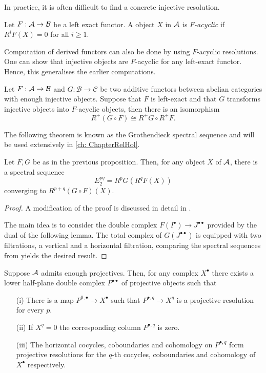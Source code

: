 In practice, it is often difficult to find a concrete injective resolution.
\begin{definition}
 Let $F:\AA \to \mathcal{B}$ be a left exact functor.
 A object $X$ in $\AA$ is {\it $F$-acyclic} if $R^iF(X) = 0$ for all $i\geq 1$.
\end{definition}
Computation of derived functors can also be done by using $F$-acyclic resolutions.
One can show that injective objects are $F$-acyclic for any left-exact functor.
Hence, this generalises the earlier computations.
\begin{proposition}{\cite[Theorem 1.3.18.]{dimca2004sheaves}}\label{prop: GrothendieckIsomorphism}
  Let $F:\AA \to \mathcal{B}$ and $G:\mathcal{B}\to \mathcal{C}$ be two additive functors between abelian categories with enough injective objects. Suppose that $F$ is left-exact and that $G$ transforms injective objects into $F$-acyclic objects, then there is an isomorphism
  $$R^+(G\circ F) \cong R^+G \circ R^+ F.$$
\end{proposition}
The following theorem is known as the Grothendieck spectral sequence and will be used extensively in \cref{ch: ChapterRelHol}.
\begin{theorem}{\cite[Theorem 1.3.19.]{dimca2004sheaves}}\label{thm: GrothendieckSpectral}
  Let $F,G$ be as in the previous proposition. Then, for any object $X$ of $\AA$, there is a spectral sequence
  $$E_2^{pq} = R^pG(R^qF(X)) $$
  converging to $R^{p+q}(G\circ F)(X).$
\end{theorem}
\begin{proof}
  A modification of the proof is discussed in detail in .

  The main idea is to consider the double complex $F(I^\bullet)\to J^{\bullet\bullet}$ provided by the dual of the following lemma.
  The total complex of $G(J^{\bullet\bullet})$ is equipped with two filtrations, a vertical and a horizontal filtration, comparing the spectral sequences from  yields the desired result.
\end{proof}
\begin{proposition}{\cite[Lemma 5.7.2.]{weibel1995introduction}}\label{prop: Cartan-Eilenberg}
  Suppose $\AA$ admits enough projectives.
  Then, for any complex $X^\bullet$ there exists a lower half-plane double complex $P^{\bullet\bullet}$ of projective objects such that
  \begin{enumerate}
    \item[(i)] There is a map $P^{0,\bullet}\to X^\bullet$ such that $P^{\bullet,q}\to X^{q}$ is a projective resolution for every $p$.
    \item[(ii)] If $X^q = 0$ the corresponding column $P^{\bullet,q}$ is zero.
    \item[(iii)] The horizontal cocycles, coboundaries and cohomology on $P^{\bullet,q}$ form projective resolutions for the $q$-th cocycles, coboundaries and cohomology of $X^\bullet$ respectively.
  \end{enumerate}
\end{proposition}
